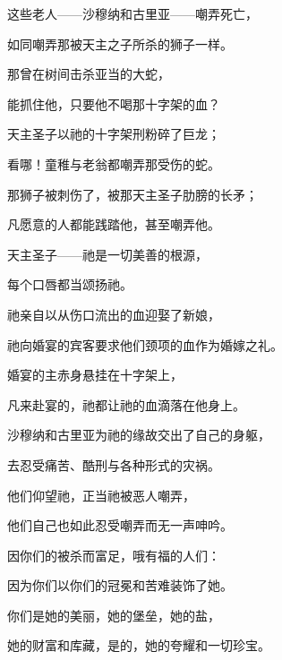 这些老人——沙穆纳和古里亚——嘲弄死亡，\par

如同嘲弄那被天主之子所杀的狮子一样。\par

那曾在树间击杀亚当的大蛇，\par

能抓住他，只要他不喝那十字架的血？\par

天主圣子以祂的十字架刑粉碎了巨龙；\par

看哪！童稚与老翁都嘲弄那受伤的蛇。\par

那狮子被刺伤了，被那天主圣子肋膀的长矛；\par

凡愿意的人都能践踏他，甚至嘲弄他。\par

天主圣子——祂是一切美善的根源，\par

每个口唇都当颂扬祂。\par

祂亲自以从伤口流出的血迎娶了新娘，\par

祂向婚宴的宾客要求他们颈项的血作为婚嫁之礼。\par

婚宴的主赤身悬挂在十字架上，\par

凡来赴宴的，祂都让祂的血滴落在他身上。\par

沙穆纳和古里亚为祂的缘故交出了自己的身躯，\par

去忍受痛苦、酷刑与各种形式的灾祸。\par

他们仰望祂，正当祂被恶人嘲弄，\par

他们自己也如此忍受嘲弄而无一声呻吟。\par

因你们的被杀而富足，哦有福的人们：\par

因为你们以你们的冠冕和苦难装饰了她。\par

你们是她的美丽，她的堡垒，她的盐，\par

她的财富和库藏，是的，她的夸耀和一切珍宝。\par

